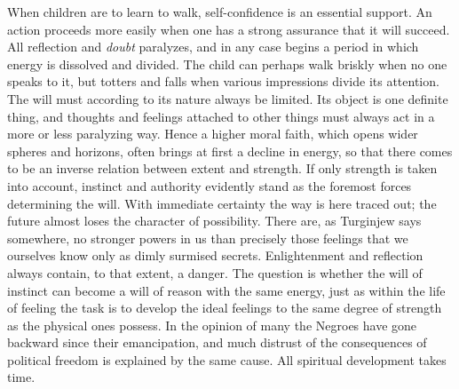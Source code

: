 \documentclass[12pt,a4paper]{book}
\begin{document}
When children are to learn to walk, self-confidence is an essential
support. An action proceeds more easily when one has a strong assurance
that it will succeed. All reflection and \emph{doubt} paralyzes, and in
any case begins a period in which energy is dissolved and divided. The
child can perhaps walk briskly when no one speaks to it, but totters and
falls when various impressions divide its attention. The will must
according to its nature always be limited. Its object is one definite
thing, and thoughts and feelings attached to other things must always act
in a more or less paralyzing way. Hence a higher moral faith, which opens
wider spheres and horizons, often brings at first a decline in energy, so
that there comes to be an inverse relation between extent and strength.
If only strength is taken into account, instinct and authority evidently
stand as the foremost forces determining the will. With immediate
certainty the way is here traced out; the future almost loses the
character of possibility. There are, as Turginjew says somewhere, no
stronger powers in us than precisely those feelings that we ourselves
know only as dimly surmised secrets. Enlightenment and reflection always
contain, to that extent, a danger. The question is whether the will of
instinct can become a will of reason with the same energy, just as within
the life of feeling the task is to develop the ideal feelings to the same
degree of strength as the physical ones possess. In the opinion of many
the Negroes have gone backward since their emancipation, and much
distrust of the consequences of political freedom is explained by the
same cause. All spiritual development takes time.
\end{document}
